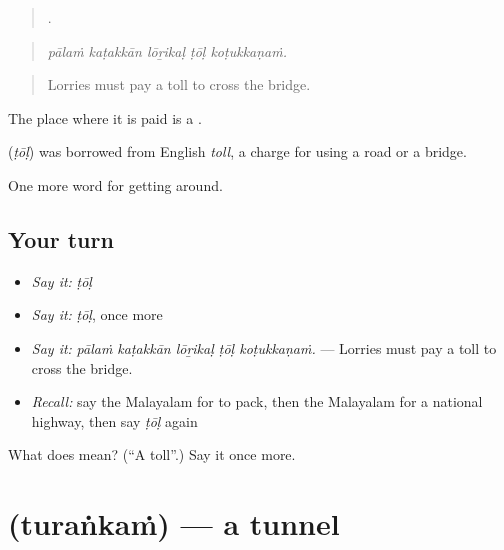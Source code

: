 \begin{quote}
    .
\end{quote}

\begin{quote}
\emph{pālaṁ kaṭakkān lōṟikaḷ ṭōḷ koṭukkaṇaṁ.}
\end{quote}

\begin{quote}
Lorries must pay a toll to cross the bridge.
\end{quote}

The place where it is paid is a  .

\begin{cousinweb}
\textbf{} (\emph{ṭōḷ}) was borrowed from English \emph{toll}, a charge for using a road or a bridge.
\end{cousinweb}

\begin{grammarlens}[title={What you've built}]
One more word for getting around.
\end{grammarlens}

\subsection*{Your turn}
\begin{itemize}
\raggedright
  \item \emph{Say it:} \emph{ṭōḷ}
  \item \emph{Say it:} \emph{ṭōḷ}, once more
  \item \emph{Say it:} \emph{pālaṁ kaṭakkān lōṟikaḷ ṭōḷ koṭukkaṇaṁ.} — Lorries must pay a toll to cross the bridge.
  \item \emph{Recall:} say the Malayalam for to pack, then the Malayalam for a national highway, then say \emph{ṭōḷ} again
\end{itemize}

\begin{tcolorbox}[breakable,colback=teal!4,colframe=teal!35!black,title={Before you move on}]
What does  mean? (\textquotedblleft{}A toll\textquotedblright{}.) Say it once more.
\end{tcolorbox}
\section[\texorpdfstring{\ml{തുരങ്കം} (turaṅkaṁ)}{തുരങ്കം (turaṅkaṁ)}]{ (turaṅkaṁ) — a tunnel}

\label{lesson:ML-C468-turankam}



